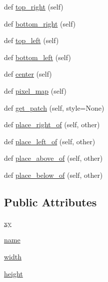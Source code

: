 \begin{DoxyCompactItemize}
def \hyperlink{classsylva_1_1misc_1_1plot_1_1rectangle_a54324a7b1be1bd85655ee60686d5944f}{top\+\_\+right} (self)
\item 
def \hyperlink{classsylva_1_1misc_1_1plot_1_1rectangle_a657018c2fcbc892047da2f18166aae85}{bottom\+\_\+right} (self)
\item 
def \hyperlink{classsylva_1_1misc_1_1plot_1_1rectangle_ac763b52f6d533f4b006421eae5f81b56}{top\+\_\+left} (self)
\item 
def \hyperlink{classsylva_1_1misc_1_1plot_1_1rectangle_a7c8c635a0a782c8e304f7440b74d8066}{bottom\+\_\+left} (self)
\item 
def \hyperlink{classsylva_1_1misc_1_1plot_1_1rectangle_a0466258315b096cd7f4e1918a1007488}{center} (self)
\item 
def \hyperlink{classsylva_1_1misc_1_1plot_1_1rectangle_a6395db39d40526291589390d31437f80}{pixel\+\_\+map} (self)
\item 
def \hyperlink{classsylva_1_1misc_1_1plot_1_1rectangle_af3defb54fedda1e1f8d886e5f840bb72}{get\+\_\+patch} (self, style=None)
\item 
def \hyperlink{classsylva_1_1misc_1_1plot_1_1rectangle_a614690234b91159164255ffc1a32f8be}{place\+\_\+right\+\_\+of} (self, other)
\item 
def \hyperlink{classsylva_1_1misc_1_1plot_1_1rectangle_ad468b38c9b5c95f14e5a6dec5d064cb1}{place\+\_\+left\+\_\+of} (self, other)
\item 
def \hyperlink{classsylva_1_1misc_1_1plot_1_1rectangle_ab0cdba67562bf45f97399b1e4529d6ac}{place\+\_\+above\+\_\+of} (self, other)
\item 
def \hyperlink{classsylva_1_1misc_1_1plot_1_1rectangle_aab959379faa71fa2fff5f1797207078b}{place\+\_\+below\+\_\+of} (self, other)
\end{DoxyCompactItemize}
\subsection*{Public Attributes}
\begin{DoxyCompactItemize}
\item 
\hyperlink{classsylva_1_1misc_1_1plot_1_1rectangle_a1bf48f6505e5a549e1056f6a8cb0b454}{xy}
\item 
\hyperlink{classsylva_1_1misc_1_1plot_1_1rectangle_aea9a12e78d03675a8af2682b9bbd656b}{name}
\item 
\hyperlink{classsylva_1_1misc_1_1plot_1_1rectangle_ad81773b097d59cb5c67b7e06ab6c022c}{width}
\item 
\hyperlink{classsylva_1_1misc_1_1plot_1_1rectangle_aa6bbc8337c03f65fc0097a8013f9c475}{height}
\end{DoxyCompactItemize}


